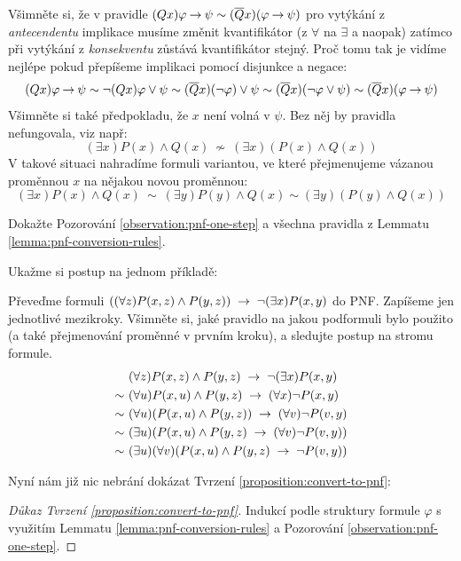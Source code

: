 Všimněte si, že v pravidle $(Qx)\varphi \mathbin{\rightarrow} \psi\sim(\overline{Q}x)(\varphi \mathbin{\rightarrow} \psi)$ pro vytýkání z \emph{antecendentu} implikace musíme změnit kvantifikátor (z $\forall$ na $\exists$ a naopak) zatímco při vytýkání z \emph{konsekventu} zůstává kvantifikátor stejný. Proč tomu tak je vidíme nejlépe pokud přepíšeme implikaci pomocí disjunkce a negace:
$$
(Qx)\varphi \mathbin{\rightarrow} \psi\sim\neg(Qx)\varphi \lor\psi\sim(\overline{Q}x)(\neg\varphi)\lor\psi\sim(\overline{Q}x)(\neg\varphi\lor\psi)\sim (\overline{Q}x)(\varphi \mathbin{\rightarrow} \psi)
$$
Všimněte si také předpokladu, že $x$ není volná v $\psi$. Bez něj by pravidla nefungovala, viz např:
$$
(\exists x)P(x)\land Q(x)\ \not\sim\ (\exists x)(P(x)\land Q(x))
$$
V takové situaci nahradíme formuli variantou, ve které přejmenujeme vázanou proměnnou $x$ na nějakou novou proměnnou: 
$$
(\exists x)P(x)\land Q(x)\ \sim\ (\exists y)P(y)\land Q(x) \sim (\exists y)(P(y)\land Q(x))
$$
\begin{exercise}
    Dokažte Pozorování \ref{observation:pnf-one-step} a všechna pravidla z Lemmatu \ref{lemma:pnf-conversion-rules}.
\end{exercise}

Ukažme si postup na jednom příkladě:

\begin{example}
    Převeďme formuli $((\forall z)P(x,z)\land P(y,z))\ \mathbin{\rightarrow}\ \neg(\exists x)P(x,y)$ do PNF. Zapíšeme jen jednotlivé mezikroky. Všimněte si, jaké pravidlo na jakou podformuli bylo použito (a také přejmenování proměnné v prvním kroku), a sledujte postup na stromu formule.
    \begin{align*}
        &\ (\forall z)P(x,z)\land P(y,z)\ \limplies\ \neg(\exists x)P(x,y)\\ \sim &\ 
        (\forall u) P(x,u)\land P(y,z)\ \limplies\ (\forall x)\neg P(x,y)\\ \sim &\ 
        (\forall u)(P(x,u)\land P(y,z))\ \limplies\ (\forall v)\neg P(v,y)\\ \sim &\ 
        (\exists u)( P(x,u)\land P(y,z)\ \limplies\ (\forall v)\neg P(v,y))\\ \sim &\ 
        (\exists u)(\forall v)( P(x,u)\land P(y,z)\ \limplies\ \neg P(v,y))
        \end{align*}    
\end{example}

Nyní nám již nic nebrání dokázat Tvrzení \ref{proposition:convert-to-pnf}:

\begin{proof}[Důkaz Tvrzení \ref{proposition:convert-to-pnf}]
    Indukcí podle struktury formule $\varphi$ s využitím Lemmatu \ref{lemma:pnf-conversion-rules} a Pozorování \ref{observation:pnf-one-step}.
\end{proof}

